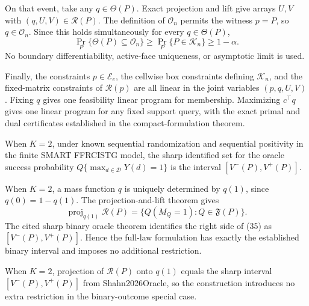 On that event, take any \(q\in\Theta(P)\).  Exact projection and lift give arrays \(U,V\) with \((q,U,V)\in\mathcal R(P)\).  The definition of \(\mathcal O_n\) permits the witness \(p=P\), so \(q\in\mathcal O_n\).  Since this holds simultaneously for every \(q\in\Theta(P)\),
\[
 \Pr_P\{\Theta(P)\subseteq\mathcal O_n\}
 \geq\Pr_P\{P\in\mathcal K_n\}\geq1-\alpha.            \tag{34}
\]
No boundary differentiability, active-face uniqueness, or asymptotic limit is used.

Finally, the constraints \(p\in\mathcal E_e\), the cellwise box constraints defining \(\mathcal K_n\), and the fixed-matrix constraints of \(\mathcal R(p)\) are all linear in the joint variables \((p,q,U,V)\).  Fixing \(q\) gives one feasibility linear program for membership.  Maximizing \(c^\top q\) gives one linear program for any fixed support query, with the exact primal and dual certificates established in the compact-formulation theorem.

When \(K=2\), under known sequential randomization and sequential positivity in the finite SMART FFRCISTG model, the sharp identified set for the oracle success probability \(Q\{\max_{d\in\mathcal D}Y(d)=1\}\) is the interval \([V^-(P),V^+(P)]\).

When \(K=2\), a mass function \(q\) is uniquely determined by \(q(1)\), since \(q(0)=1-q(1)\).  The projection-and-lift theorem gives
\[
 \operatorname{proj}_{q(1)}\mathcal R(P)
 =\{Q(M_Q=1):Q\in\mathfrak F(P)\}.                       \tag{35}
\]
The cited sharp binary oracle theorem identifies the right side of (35) as \([V^-(P),V^+(P)]\).  Hence the full-law formulation has exactly the established binary interval and imposes no additional restriction.

When \(K=2\), projection of \(\mathcal R(P)\) onto \(q(1)\) equals the sharp interval \([V^-(P),V^+(P)]\) from Shahn2026Oracle, so the construction introduces no extra restriction in the binary-outcome special case.
